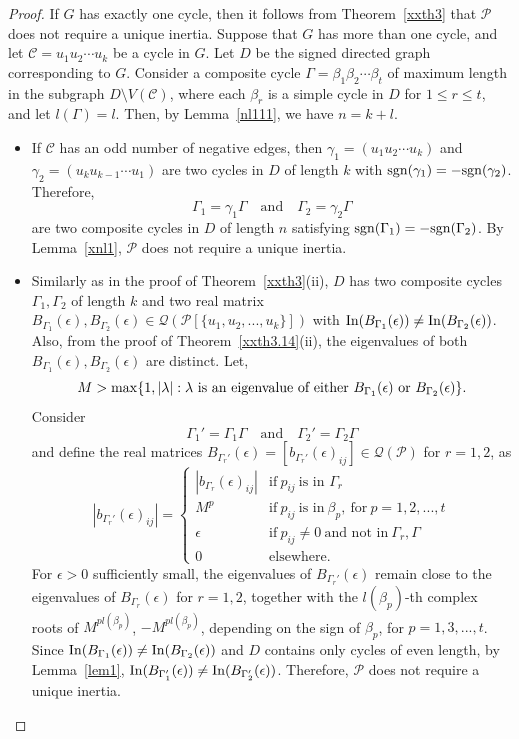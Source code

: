 \documentclass[a4paper, 10pt]{article}
\numberwithin{equation}{section}
\def\sgn{{\rm sgn}}
\def\In{{\rm In}}
\def\max{{\rm max}}
\begin{document}
\begin{proof} If $G$ has exactly one cycle, then it follows from Theorem~\ref{xxth3} that $\mathcal{P}$ does not require a unique inertia. Suppose that $G$ has more than one cycle, and let $\mathcal{C} = u_1u_2\cdots u_k$ be a cycle in $G$. Let $D$ be the signed directed graph corresponding to $G$. 
	Consider a composite cycle $\Gamma = \beta_1 \beta_2 \cdots \beta_t$ of maximum length 
	in the subgraph $D \setminus V(\mathcal{C})$, where each $\beta_r$ is a simple cycle in $D$ 
	for $1 \leq r \leq t$, and let $l(\Gamma) = l$. Then, by Lemma~\ref{nl111}, we have $n = k + l$.  
	\begin{itemize}
		\item[i.] If $\mathcal{C}$ has an odd number of negative edges, then 
		$\gamma_1=(u_1u_2\cdots u_k)$ and $\gamma_2=(u_ku_{k-1}\cdots u_1)$ are two cycles in $D$ of length $k$ with $\sgn(\gamma_1)=-\sgn(\gamma_2)$. 
		Therefore, 
		$$
		\Gamma_1 = \gamma_1\Gamma \quad\text{and}\quad \Gamma_2 = \gamma_2\Gamma
		$$
		are two composite cycles in $D$ of length $n$ satisfying $\sgn(\Gamma_1)=-\sgn(\Gamma_2)$. 
		By Lemma~\ref{xnl1}, $\mathcal{P}$ does not require a unique inertia.
		
		
		\item[ii.] Similarly as in the proof of Theorem~\ref{xxth3}(ii), $D$ has two composite cycles
		$\Gamma_1,\Gamma_2$ of length $k$ and two real matrix $B_{\Gamma_1}(\epsilon),B_{\Gamma_2}(\epsilon) \in \mathcal{Q}(\mathcal{P}[\{u_1,u_2,...,u_k\}])$ with $\In(B_{\Gamma_1}(\epsilon))\neq \In(B_{\Gamma_2}(\epsilon))$. Also, from the proof of Theorem~\ref{xxth3.14}(ii), the eigenvalues of both $B_{\Gamma_1}(\epsilon),B_{\Gamma_2}(\epsilon)$ are distinct.  Let,
		$$M>\max\{1,|\lambda|: \lambda~ \text{is an eigenvalue of either} ~B_{\Gamma_1}(\epsilon)~\text{or}~B_{\Gamma_2}(\epsilon)\}.$$ 
		Consider $$\Gamma_1'=\Gamma_1\Gamma\quad\text{and}\quad\Gamma_2'=\Gamma_2\Gamma$$
		and define the real matrices $B_{\Gamma_r'}(\epsilon)=[b_{\Gamma_r'}(\epsilon)_{ij}]\in \mathcal{Q}(\mathcal{P})$ for $r=1,2$, as
		$$|b_{\Gamma_r'}(\epsilon)_{ij}|= \begin{cases}
			|b_{\Gamma_r}(\epsilon)_{ij}| & \text{if}\ p_{ij}~ \text{is in } \Gamma_r \\
			M^p & \text{if}\ p_{ij}~ \text{is in}~ \beta_p,~\text{for}~p=1,2,...,t \\
			\epsilon & \text{if}~ p_{ij}\neq 0~\text{and not in}~\Gamma_r, \Gamma\\
			0 & \text{elsewhere.}
		\end{cases}$$
		For $\epsilon>0$ sufficiently small, the eigenvalues of $B_{\Gamma_r'}(\epsilon)$ remain close to the eigenvalues of $B_{\Gamma_r}(\epsilon)$  for $r=1,2$, together with the $l(\beta_p)$-th complex roots of $M^{pl(\beta_p)}$, $-M^{pl(\beta_p)}$, depending on the sign of $\beta_p$, for $p=1,3,...,t$. Since $\In(B_{\Gamma_1}(\epsilon))\neq \In(B_{\Gamma_2}(\epsilon))$ and $D$ contains only cycles of even length, by Lemma~\ref{lem1}, $\In(B_{\Gamma_1'}(\epsilon))\neq \In(B_{\Gamma_2'}(\epsilon))$. Therefore, $\mathcal{P}$ does not require a unique inertia. 
		

\end{itemize}
\end{proof}
\end{document}

